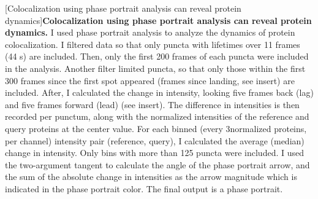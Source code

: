 \begin{centering}
\captionsetup{parbox=none}
[Colocalization using phase portrait analysis can reveal protein dynamics]{\textbf{Colocalization using phase portrait analysis can reveal protein dynamics.} I used phase portrait analysis to analyze the dynamics of protein colocalization. I filtered data so that only puncta with lifetimes over 11 frames (44 s) are included. Then, only the first 200 frames of each puncta were included in the analysis. Another filter limited puncta, so that only those within the first 300 frames since the first spot appeared (frames since landing, see insert) are included. After, I calculated the change in intensity, looking five frames back (lag) and five frames forward (lead) (see insert). The difference in intensities is then recorded per punctum, along with the normalized intensities of the reference and query proteins at the center value. For each binned (every 3\times normalized proteins, per channel) intensity pair (reference, query), I calculated the average (median) change in intensity. Only bins with more than 125 puncta were included. I used the two-argument tangent to calculate the angle of the phase portrait arrow, and the sum of the absolute change in intensities as the arrow magnitude which is indicated in the phase portrait color. The final output is a phase portrait.}
\label{m:6}
\end{centering}

